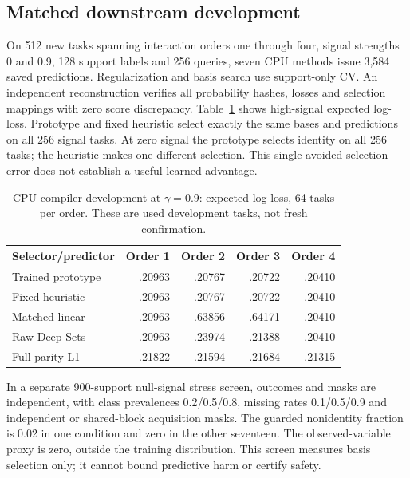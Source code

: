\documentclass[10pt]{article}
\begin{document}
\subsection{Matched downstream development}
On 512 new tasks spanning interaction orders one through four, signal strengths 0 and 0.9, 128 support labels and 256 queries, seven CPU methods issue 3,584 saved predictions. Regularization and basis search use support-only CV. An independent reconstruction verifies all probability hashes, losses and selection mappings with zero score discrepancy. Table~\ref{tab:compiler_cpu} shows high-signal expected log-loss. Prototype and fixed heuristic select exactly the same bases and predictions on all 256 signal tasks. At zero signal the prototype selects identity on all 256 tasks; the heuristic makes one different selection. This single avoided selection error does not establish a useful learned advantage.

\begin{table}[t]
\centering\small
\caption{CPU compiler development at $\gamma=0.9$: expected log-loss, 64 tasks per order. These are used development tasks, not fresh confirmation.}
\label{tab:compiler_cpu}
\begin{tabular}{@{}lrrrr@{}}\toprule
Selector/predictor & Order 1 & Order 2 & Order 3 & Order 4\\\midrule
Trained prototype & .20963 & .20767 & .20722 & .20410\\
Fixed heuristic & .20963 & .20767 & .20722 & .20410\\
Matched linear & .20963 & .63856 & .64171 & .20410\\
Raw Deep Sets & .20963 & .23974 & .21388 & .20410\\
Full-parity L1 & .21822 & .21594 & .21684 & .21315\\\bottomrule
\end{tabular}
\end{table}

In a separate 900-support null-signal stress screen, outcomes and masks are independent, with class prevalences 0.2/0.5/0.8, missing rates 0.1/0.5/0.9 and independent or shared-block acquisition masks. The guarded nonidentity fraction is 0.02 in one condition and zero in the other seventeen. The observed-variable proxy is zero, outside the training distribution. This screen measures basis selection only; it cannot bound predictive harm or certify safety.
\end{document}
